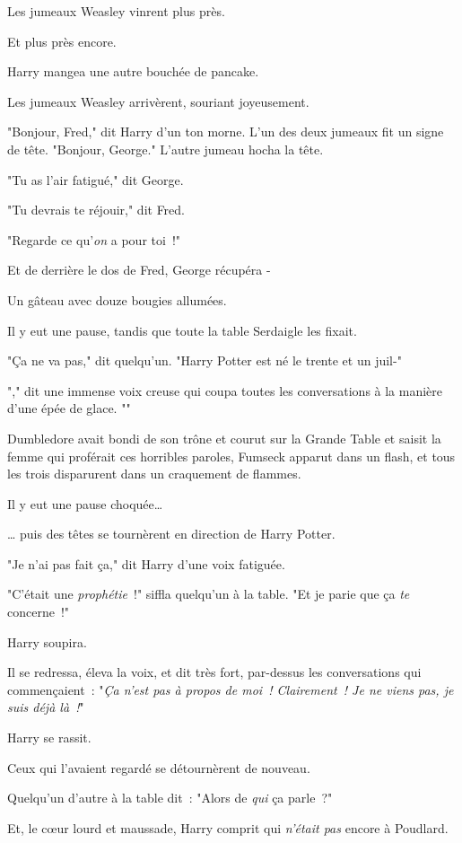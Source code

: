 Les jumeaux Weasley vinrent plus près.

Et plus près encore.

Harry mangea une autre bouchée de pancake.

Les jumeaux Weasley arrivèrent, souriant joyeusement.

"Bonjour, Fred," dit Harry d'un ton morne. L'un des deux jumeaux fit un signe de tête. "Bonjour, George." L'autre jumeau hocha la tête.

"Tu as l'air fatigué," dit George.

"Tu devrais te réjouir," dit Fred.

"Regarde ce qu'\emph{on} a pour toi~!"

Et de derrière le dos de Fred, George récupéra -

Un gâteau avec douze bougies allumées.

Il y eut une pause, tandis que toute la table Serdaigle les fixait.

"Ça ne va pas," dit quelqu'un. "Harry Potter est né le trente et un juil-"

"," dit une immense voix creuse qui coupa toutes les conversations à la manière d'une épée de glace. ""

Dumbledore avait bondi de son trône et courut sur la Grande Table et saisit la femme qui proférait ces horribles paroles, Fumseck apparut dans un flash, et tous les trois disparurent dans un craquement de flammes.

Il y eut une pause choquée…

… puis des têtes se tournèrent en direction de Harry Potter.

"Je n'ai pas fait ça," dit Harry d'une voix fatiguée.

"C'était une \emph{prophétie}~!" siffla quelqu'un à la table. "Et je parie que ça \emph{te} concerne~!"

Harry soupira.

Il se redressa, éleva la voix, et dit très fort, par-dessus les conversations qui commençaient~: "\emph{Ça n'est pas à propos de moi~! Clairement~! Je ne viens pas, je suis déjà là~!}"

Harry se rassit.

Ceux qui l'avaient regardé se détournèrent de nouveau.

Quelqu'un d'autre à la table dit~: "Alors de \emph{qui} ça parle~?"

Et, le cœur lourd et maussade, Harry comprit qui \emph{n'était pas} encore à Poudlard.

